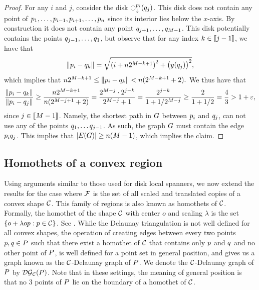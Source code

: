\documentclass[12pt]{article}%
\begin{document}
\begin{proof}
    For any $i$ and $j$, consider the disk
    $\diskVY{\pa_i}{\pb_j}$. This disk does not contain any point of
    $p_1,\ldots, p_{i-1}, p_{i+1}, \ldots, p_{n}$ since its
    interior lies below the $x$-axis. By construction it does not
    contain any point $q_{j+1}, \ldots, q_{M-1}$. This disk
    potentially contains the points $q_{j-1}, \ldots, q_1$,
    but observe that for any index $k \in \IRX{j-1}$, we have that
    \begin{equation*}
        \dY{\pa_i}{\pb_k} %
        =%
        \sqrt{ \pth{i + n 2^{M-k+1} }^2 + \bigl( y(\pb_j) \bigr)^2 },
    \end{equation*}
    which implies that
    \begin{math}
        n 2^{M-k+1}%
        \leq%
        \dY{\pa_i}{\pb_k} %
        <%
        n( 2^{M-k+1} +2).
    \end{math}
    We thus have that
    \begin{equation*}
        \frac{\dY{\pa_i}{\pb_k}}{\dY{\pa_i}{\pb_j}}
        \geq%
        \frac{n 2^{M-k+1}}{n( 2^{M-j+1} +2)}
        =%
        \frac{ 2^{M-j}\cdot 2^{j-k}}{ 2^{M-j} +1}
        =%
        \frac{  2^{j-k}}{ 1 + 1/2^{M-j}}
        \geq
        \frac{2}{1+1/2}
        = \frac{4}{3}
        > 1+\eps,
    \end{equation*}
    since $j \in \IRX{M-1}$.  Namely, the shortest path in $G$
    between $p_i$ and $q_j$, can not use any of the points
    $q_{1}, \ldots q_{j-1}$. As such, the graph $G$ must contain
    the edge $p_i q_j$. This implies that
    $|\EGX{\G}| \geq n (M-1)$, which implies the claim.
\end{proof}






\subsection{Homothets of a convex region}
\label{subsection:homothets}

Using arguments similar to those used for disk local spanners, we now extend the results for the case where
$\mathcal{F}$ is the set of all scaled and translated copies of a
convex shape $\mathcal{C}$. This family of regions is also known as homothets of $\mathcal{C}$. Formally, the homothet of the shape $\mathcal{C}$ with center $o$ and scaling $\lambda$ is the set $\{o + \lambda o p : p \in \mathcal{C}\}$. See . While the Delaunay triangulation is not well
defined for all convex shapes, the operation of creating edges between every
two points $p,q\in P$ such that there exist a homothet of $\mathcal{C}$ that
contains only $p$ and $q$ and no other point of $P$, is well
defined for a point set in general position, and gives us a graph known as the $\mathcal{C}$-Delaunay graph of $P$. We denote the $\mathcal{C}$-Delaunay graph of $P$ by $\mathcal{DG}_{\mathcal{C}}(P)$. 
Note that in these settings, the meaning of general position is that no 3 points of $P$ lie on the boundary of a homothet of $\mathcal{C}$.
\end{document}
